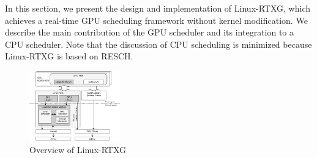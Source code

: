 \label{sec:design_imple}
In this section, we present the design and implementation of Linux-RTXG,
which achieves a real-time GPU scheduling framework without kernel modification.
We describe the main contribution of the GPU scheduler and its integration to a CPU scheduler.
Note that the discussion of CPU scheduling is minimized because Linux-RTXG is based on RESCH.

\begin{figure}[t]
\begin{center}
\includegraphics[width=0.35\textwidth]{img/overview.pdf}
\caption{Overview of Linux-RTXG}
\label{fig:overview}
\end{center}
\end{figure}


